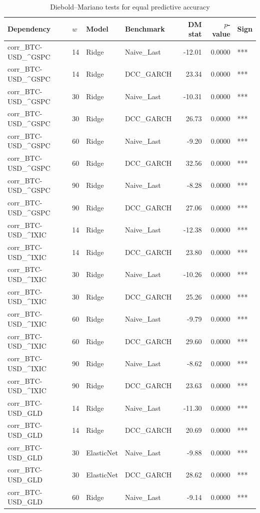 \begin{table}[H]
\centering
\small
\caption{Diebold--Mariano tests for equal predictive accuracy}
\label{tab:dm_tests}
\begin{tabular}{llllrrl}
\toprule
Dependency & $w$ & Model & Benchmark & DM stat & $p$-value & Sign \\
\midrule
corr_BTC-USD_^GSPC & 14 & Ridge & Naive_Last & -12.01 & 0.0000 & *** \\
corr_BTC-USD_^GSPC & 14 & Ridge & DCC_GARCH & 23.34 & 0.0000 & *** \\
corr_BTC-USD_^GSPC & 30 & Ridge & Naive_Last & -10.31 & 0.0000 & *** \\
corr_BTC-USD_^GSPC & 30 & Ridge & DCC_GARCH & 26.73 & 0.0000 & *** \\
corr_BTC-USD_^GSPC & 60 & Ridge & Naive_Last & -9.20 & 0.0000 & *** \\
corr_BTC-USD_^GSPC & 60 & Ridge & DCC_GARCH & 32.56 & 0.0000 & *** \\
corr_BTC-USD_^GSPC & 90 & Ridge & Naive_Last & -8.28 & 0.0000 & *** \\
corr_BTC-USD_^GSPC & 90 & Ridge & DCC_GARCH & 27.06 & 0.0000 & *** \\
corr_BTC-USD_^IXIC & 14 & Ridge & Naive_Last & -12.38 & 0.0000 & *** \\
corr_BTC-USD_^IXIC & 14 & Ridge & DCC_GARCH & 23.80 & 0.0000 & *** \\
corr_BTC-USD_^IXIC & 30 & Ridge & Naive_Last & -10.26 & 0.0000 & *** \\
corr_BTC-USD_^IXIC & 30 & Ridge & DCC_GARCH & 25.26 & 0.0000 & *** \\
corr_BTC-USD_^IXIC & 60 & Ridge & Naive_Last & -9.79 & 0.0000 & *** \\
corr_BTC-USD_^IXIC & 60 & Ridge & DCC_GARCH & 29.60 & 0.0000 & *** \\
corr_BTC-USD_^IXIC & 90 & Ridge & Naive_Last & -8.62 & 0.0000 & *** \\
corr_BTC-USD_^IXIC & 90 & Ridge & DCC_GARCH & 23.63 & 0.0000 & *** \\
corr_BTC-USD_GLD & 14 & Ridge & Naive_Last & -11.30 & 0.0000 & *** \\
corr_BTC-USD_GLD & 14 & Ridge & DCC_GARCH & 20.69 & 0.0000 & *** \\
corr_BTC-USD_GLD & 30 & ElasticNet & Naive_Last & -9.88 & 0.0000 & *** \\
corr_BTC-USD_GLD & 30 & ElasticNet & DCC_GARCH & 28.62 & 0.0000 & *** \\
corr_BTC-USD_GLD & 60 & Ridge & Naive_Last & -9.14 & 0.0000 & *** \\

\end{tabular}
\end{table}
